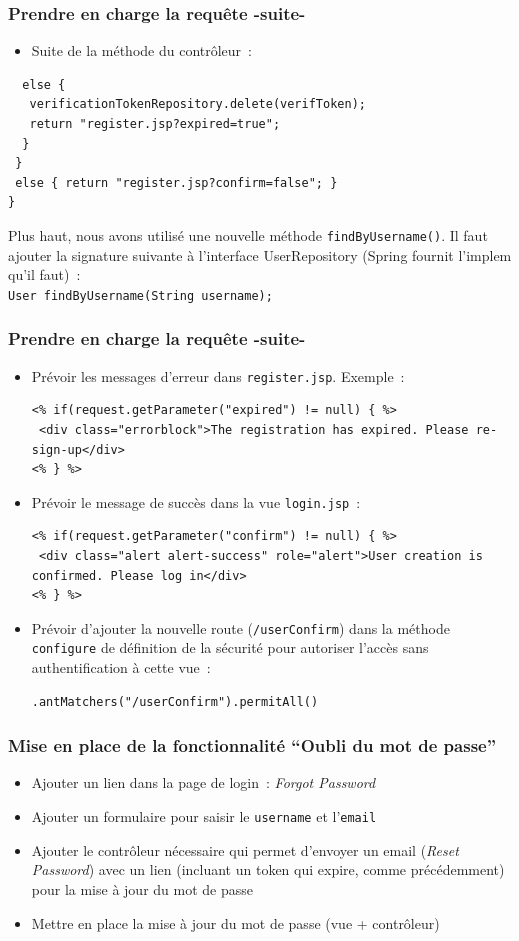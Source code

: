\documentclass{beamer}
\begin{document}
\begin{frame}[fragile]
\frametitle{Prendre en charge la requête -suite-}
\begin{itemize}
	\item Suite de la méthode du contrôleur~:

\end{itemize}	
\begin{lstlisting}
  else {
   verificationTokenRepository.delete(verifToken);
   return "register.jsp?expired=true";
  }
 }
 else { return "register.jsp?confirm=false"; }
}
\end{lstlisting}
Plus haut, nous avons utilisé une nouvelle méthode \texttt{findByUsername()}. Il faut ajouter la signature suivante à l'interface UserRepository (Spring fournit l'implem qu'il faut)~:\\
\texttt{User findByUsername(String username);}
\end{frame}

\begin{frame}[fragile]
\frametitle{Prendre en charge la requête -suite-}
\begin{itemize}
	\item Prévoir les messages d'erreur dans \texttt{register.jsp}. Exemple~:
\begin{lstlisting}
<% if(request.getParameter("expired") != null) { %>
 <div class="errorblock">The registration has expired. Please re-sign-up</div>
<% } %>
\end{lstlisting}
	\item Prévoir le message de succès dans la vue \texttt{login.jsp}~:
\begin{lstlisting}
<% if(request.getParameter("confirm") != null) { %>
 <div class="alert alert-success" role="alert">User creation is confirmed. Please log in</div>
<% } %>
\end{lstlisting}
	\item Prévoir d'ajouter la nouvelle route (\texttt{/userConfirm}) dans la méthode \texttt{configure} de définition de la sécurité pour autoriser l'accès sans authentification à cette vue~:
\begin{lstlisting}
.antMatchers("/userConfirm").permitAll()
\end{lstlisting}
	\end{itemize}
\end{frame}

\begin{frame}[fragile]
	\frametitle{Mise en place de la fonctionnalité ``Oubli du mot de passe''}
	\begin{itemize}
		\item Ajouter un lien dans la page de login~: \textit{Forgot Password}
		\item Ajouter un formulaire pour saisir le \texttt{username} et l'\texttt{email}
		\item Ajouter le contrôleur nécessaire qui permet d'envoyer un email (\textit{Reset Password}) avec un lien (incluant un token qui expire, comme précédemment) pour la mise à jour du mot de passe
		\item Mettre en place la mise à jour du mot de passe (vue + contrôleur)
	\end{itemize}
\end{frame}
\end{document}

